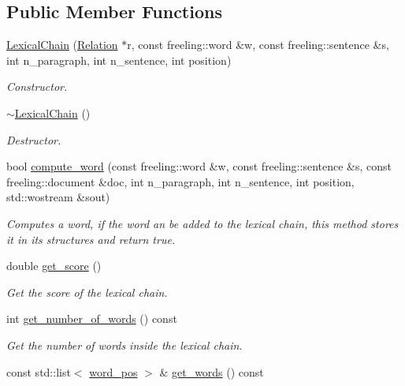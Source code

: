 \subsection*{Public Member Functions}
\begin{DoxyCompactItemize}
\item 
\hyperlink{classLexicalChain_a1035313b140bb9833030d54f2a616082}{Lexical\+Chain} (\hyperlink{classRelation}{Relation} $\ast$r, const freeling\+::word \&w, const freeling\+::sentence \&s, int n\+\_\+paragraph, int n\+\_\+sentence, int position)
\begin{DoxyCompactList}\small\item\em Constructor. \end{DoxyCompactList}\item 
\hyperlink{classLexicalChain_a95f08ad98d07d5eec86cf68b77bc6eee}{$\sim$\+Lexical\+Chain} ()
\begin{DoxyCompactList}\small\item\em Destructor. \end{DoxyCompactList}\item 
bool \hyperlink{classLexicalChain_a22e252664430e855efd2adc05d120952}{compute\+\_\+word} (const freeling\+::word \&w, const freeling\+::sentence \&s, const freeling\+::document \&doc, int n\+\_\+paragraph, int n\+\_\+sentence, int position, std\+::wostream \&sout)
\begin{DoxyCompactList}\small\item\em Computes a word, if the word an be added to the lexical chain, this method stores it in its structures and return true. \end{DoxyCompactList}\item 
double \hyperlink{classLexicalChain_ad7b400e51350a05025d93ca1d97ee4a9}{get\+\_\+score} ()
\begin{DoxyCompactList}\small\item\em Get the score of the lexical chain. \end{DoxyCompactList}\item 
int \hyperlink{classLexicalChain_a43ccc424bcb3be5d7051853e0a310294}{get\+\_\+number\+\_\+of\+\_\+words} () const 
\begin{DoxyCompactList}\small\item\em Get the number of words inside the lexical chain. \end{DoxyCompactList}\item 
const std\+::list$<$ \hyperlink{structword__pos}{word\+\_\+pos} $>$ \& \hyperlink{classLexicalChain_ac3c54f9712f691928d1fb20d8924f441}{get\+\_\+words} () const 

\end{DoxyCompactItemize}
